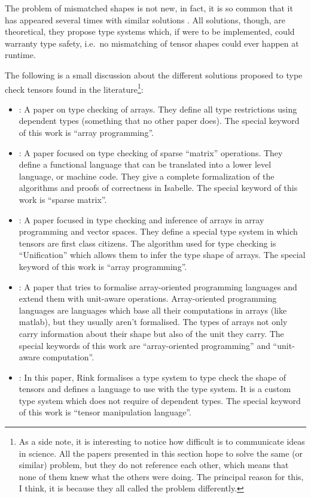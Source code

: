 The problem of mismatched shapes is not new, in fact, it is so common
that it has appeared several times with similar solutions
\autocites{arnold_specifying_2010}{griffioen_type_2015}{rink_modeling_2018}{slepak_array-oriented_2014}{trojahner_dependently_2009}.
All solutions, though, are theoretical, they propose type systems which,
if were to be implemented, could warranty type safety, i.e.~no
mismatching of tensor shapes could ever happen at runtime.

The following is a small discussion about the different solutions
proposed to type check tensors found in the literature\footnote{As a
  side note, it is interesting to notice how difficult is to communicate
  ideas in science. All the papers presented in this section hope to
  solve the same (or similar) problem, but they do not reference each
  other, which means that none of them knew what the others were doing.
  The principal reason for this, I think, it is because they all called
  the problem differently.}:

\begin{itemize}
\item
  \textcite{trojahner_dependently_2009}: A paper on type checking of
  arrays. They define all type restrictions using dependent types
  (something that no other paper does). The special keyword of this work
  is \enquote{array programming}.
\item
  \textcite{arnold_specifying_2010}: A paper focused on type checking of
  sparse \enquote{matrix} operations. They define a functional language
  that can be translated into a lower level language, or machine code.
  They give a complete formalization of the algorithms and proofs of
  correctness in Isabelle. The special keyword of this work is
  \enquote{sparse matrix}.
\item
  \textcite{griffioen_type_2015}: A paper focused in type checking and
  inference of arrays in array programming and vector spaces. They
  define a special type system in which tensors are first class
  citizens. The algorithm used for type checking is
  \enquote{Unification} which allows them to infer the type shape of
  arrays. The special keyword of this work is \enquote{array
  programming}.
\item
  \textcite{slepak_array-oriented_2014}: A paper that tries to formalise
  array-oriented programming languages and extend them with unit-aware
  operations. Array-oriented programming languages are languages which
  base all their computations in arrays (like matlab), but they usually
  aren't formalised. The types of arrays not only carry information
  about their shape but also of the unit they carry. The special
  keywords of this work are \enquote{array-oriented programming} and
  \enquote{unit-aware computation}.
\item
  \textcite{rink_modeling_2018}: In this paper, Rink formalises a type
  system to type check the shape of tensors and defines a language to
  use with the type system. It is a custom type system which does not
  require of dependent types. The special keyword of this work is
  \enquote{tensor manipulation language}.
\end{itemize}
